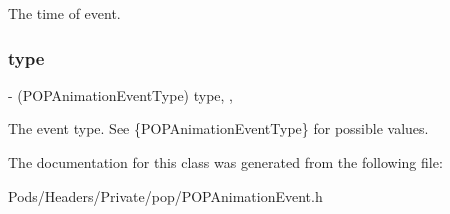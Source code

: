 The time of event. \mbox{\label{interface_p_o_p_animation_event_a3b510670ec4c3481bff1c5e4c0e8be94}} 
\subsubsection{\texorpdfstring{type}{type}}
{\footnotesize\ttfamily -\/ (P\+O\+P\+Animation\+Event\+Type) type\hspace{0.3cm}{\ttfamily [read]}, {\ttfamily [nonatomic]}, {\ttfamily [assign]}}

The event type. See \{P\+O\+P\+Animation\+Event\+Type\} for possible values. 

The documentation for this class was generated from the following file\+:\begin{DoxyCompactItemize}
\item 
Pods/\+Headers/\+Private/pop/P\+O\+P\+Animation\+Event.\+h\end{DoxyCompactItemize}
